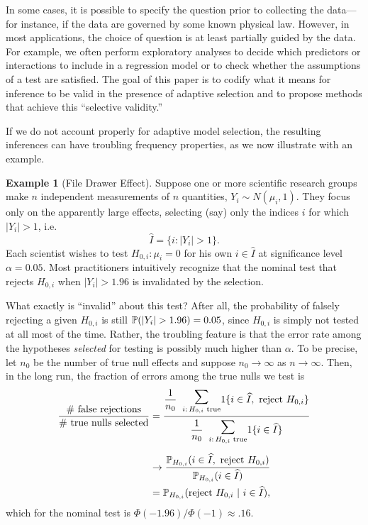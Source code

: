 \documentclass{article}
\theoremstyle{definition}
\newtheorem{example}{Example}
\newcommand{\hI}{\widehat{I}}
\begin{document}
In some cases, it is possible to specify the question prior to collecting the data---for instance, if the data are governed by some known physical law. However, in most applications, the choice of question is at least partially guided by the data. For example, we often perform exploratory analyses to decide which predictors or interactions to include in a regression model or to check whether the assumptions of a test are satisfied. The goal of this paper is to codify what it means for inference to be valid in the presence of adaptive selection and to propose methods that achieve this ``selective validity.''

If we do not account properly for adaptive model selection, the resulting inferences can have troubling frequency properties, as we now illustrate with an example.

\begin{example}[File Drawer Effect]
\label{ex:file_drawer}
Suppose one or more scientific research groups make $n$ independent measurements of $n$ quantities, ${Y_i \sim N(\mu_i, 1)}$. They focus only on the apparently large effects, selecting (say) only the indices $i$ for which $|Y_i|>1$, i.e.
\[ \hI = \{i : |Y_i| > 1\}. \]
Each scientist wishes to test $H_{0,i}: \mu_i = 0$ for his own $i \in \hI$ at significance level $\alpha = 0.05$. Most practitioners intuitively recognize that the nominal test that rejects $H_{0,i}$ when $|Y_i| > 1.96$ is invalidated by the selection.

What exactly is ``invalid'' about this test? After all, the probability of falsely rejecting a given $H_{0,i}$ is still $\P(|Y_i| > 1.96) = 0.05$, since $H_{0,i}$ is simply not tested at all most of the time. Rather, the troubling feature is that the error rate among the hypotheses {\em selected} for testing is possibly much higher than $\alpha$.
To be precise, let $n_0$ be the number of true null effects and suppose $n_0 \to \infty$ as $n\to\infty$. Then, in the long run, the fraction of errors among the true nulls we test is
\begin{align}
\frac{\text{\# false rejections}}{\text{\# true nulls selected}} &= \genfrac{}{}{}{}
{\raisebox{10pt}{$\dfrac{1}{n_0}\;\;\raisebox{3pt}{$\displaystyle\underset{{i:\,H_{0,i}\text{ true}}}\sum$} 1\{ i\in \hI,\ \text{reject $H_{0,i}$} \}$}}
{\raisebox{-7pt}{$\dfrac{1}{n_0}\;\;\raisebox{3pt}{$\displaystyle\underset{{i:\,H_{0,i}\text{ true}}}\sum$} 1\{ i \in \hI \}$}}
\nonumber\\[5pt]
&\to \frac{\P_{H_{0,i}}(i \in \hI,\ \text{reject $H_{0,i}$})}{\P_{H_{0,i}}(i \in \hI)} \nonumber\\
&= \P_{H_{0,i}}(\text{reject $H_{0,i}$}\ |\ i \in \hI), \label{eq:selective_type_1_error}
\end{align}
which for the nominal test is $\Phi(-1.96) / \Phi(-1)  \approx .16$.


\end{example}
\end{document}
